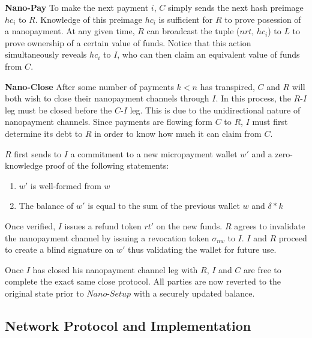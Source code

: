 \textbf{Nano-Pay} To make the next payment $i$, $C$ simply sends the next hash preimage $hc_i$ to
$R$. Knowledge of this preimage $hc_i$ is sufficient for $R$ to prove posession
of a nanopayment. At any given time, $R$ can broadcast the tuple ($nrt$, $hc_i$)
to $L$ to prove ownership of a certain value of funds. Notice that this action
simultaneously reveals $hc_i$ to $I$, who can then claim an equivalent value of
funds from $C$.

\textbf{Nano-Close} After some number of payments $k < n$ has transpired, $C$ and $R$ will both wish
to close their nanopayment channels through $I$. In this process, the $R$-$I$ leg
must be closed before the $C$-$I$ leg. This is due to the unidirectional nature
of nanopayment channels. Since payments are flowing form $C$ to $R$, $I$ must
first determine its debt to $R$ in order to know how much it can claim from $C$.

$R$ first sends to $I$ a commitment to a new micropayment wallet $w'$ and a
zero-knowledge proof of the following statements:

\begin{enumerate}
\item $w'$ is well-formed from $w$
\item The balance of $w'$ is equal to the sum of the previous wallet $w$ and
  $\delta * k$
\end{enumerate}

Once verified, $I$ issues a refund token $rt'$ on the new funds. $R$ agrees to
invalidate the nanopayment channel by issuing a revocation token $\sigma_{nw}$
to $I$. $I$ and $R$ proceed to create a blind signature on $w'$ thus validating
the wallet for future use.

Once $I$ has closed his nanopayment channel leg with $R$, $I$ and $C$ are free
to complete the exact same close protocol. All parties are now reverted to the
original state prior to $Nano$-$Setup$ with a securely updated balance.

\subsection{Network Protocol and Implementation}

